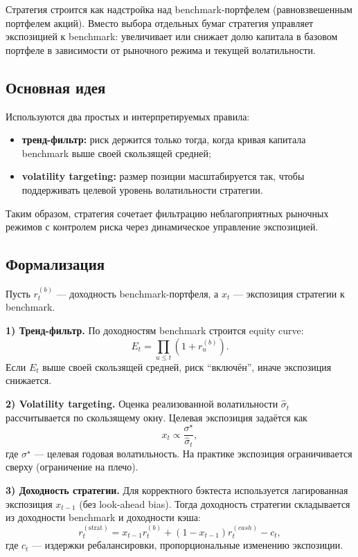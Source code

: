 \documentclass[12pt]{article}
\begin{document}
Стратегия строится как надстройка над benchmark-портфелем (равновзвешенным портфелем акций). Вместо выбора отдельных бумаг стратегия управляет экспозицией к benchmark: увеличивает или снижает долю капитала в базовом портфеле в зависимости от рыночного режима и текущей волатильности.

\subsection*{Основная идея}
Используются два простых и интерпретируемых правила:
\begin{itemize}
    \item \textbf{тренд-фильтр:} риск держится только тогда, когда кривая капитала benchmark выше своей скользящей средней;
    \item \textbf{volatility targeting:} размер позиции масштабируется так, чтобы поддерживать целевой уровень волатильности стратегии.
\end{itemize}

Таким образом, стратегия сочетает фильтрацию неблагоприятных рыночных режимов с контролем риска через динамическое управление экспозицией.

\subsection*{Формализация}
Пусть \(r_t^{(b)}\) --- доходность benchmark-портфеля, а \(x_t\) --- экспозиция стратегии к benchmark.

\textbf{1) Тренд-фильтр.}  
По доходностям benchmark строится equity curve:
\[
E_t = \prod_{u \le t}(1+r_u^{(b)}).
\]
Если \(E_t\) выше своей скользящей средней, риск ``включён'', иначе экспозиция снижается.

\textbf{2) Volatility targeting.}  
Оценка реализованной волатильности \(\widehat{\sigma}_t\) рассчитывается по скользящему окну. Целевая экспозиция задаётся как
\[
x_t \propto \frac{\sigma^\star}{\widehat{\sigma}_t},
\]
где \(\sigma^\star\) --- целевая годовая волатильность. На практике экспозиция ограничивается сверху (ограничение на плечо).

\textbf{3) Доходность стратегии.}  
Для корректного бэктеста используется лагированная экспозиция \(x_{t-1}\) (без look-ahead bias). Тогда доходность стратегии складывается из доходности benchmark и доходности кэша:
\[
r_t^{(\text{strat})} = x_{t-1} r_t^{(b)} + (1-x_{t-1}) r_t^{(cash)} - c_t,
\]
где \(c_t\) --- издержки ребалансировки, пропорциональные изменению экспозиции.
\end{document}
